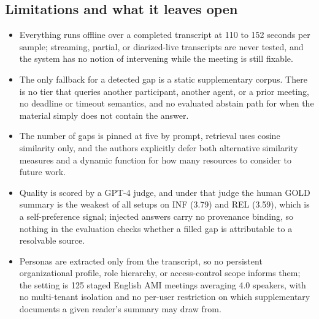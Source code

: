 \subsection{Limitations and what it leaves open}
\begin{itemize}[leftmargin=*, itemsep=1pt, topsep=2pt]
  \item Everything runs offline over a completed transcript at 110 to 152 seconds per sample; streaming, partial, or diarized-live transcripts are never tested, and the system has no notion of intervening while the meeting is still fixable.
  \item The only fallback for a detected gap is a static supplementary corpus. There is no tier that queries another participant, another agent, or a prior meeting, no deadline or timeout semantics, and no evaluated abstain path for when the material simply does not contain the answer.
  \item The number of gaps is pinned at five by prompt, retrieval uses cosine similarity only, and the authors explicitly defer both alternative similarity measures and a dynamic function for how many resources to consider to future work.
  \item Quality is scored by a GPT-4 judge, and under that judge the human GOLD summary is the weakest of all setups on INF (3.79) and REL (3.59), which is a self-preference signal; injected answers carry no provenance binding, so nothing in the evaluation checks whether a filled gap is attributable to a resolvable source.
  \item Personas are extracted only from the transcript, so no persistent organizational profile, role hierarchy, or access-control scope informs them; the setting is 125 staged English AMI meetings averaging 4.0 speakers, with no multi-tenant isolation and no per-user restriction on which supplementary documents a given reader's summary may draw from.
\end{itemize}
